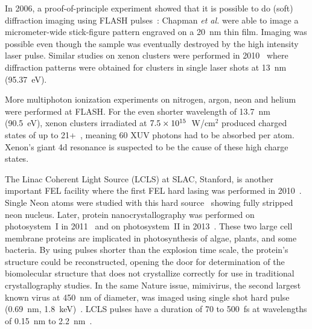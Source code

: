 In 2006, a proof-of-principle experiment showed that it is possible to
do (soft) \xray diffraction imaging using FLASH pulses~\cite{Chapman2006}:
Chapman \textit{et al.} were able to image a micrometer-wide stick-figure pattern
engraved on a 20~nm thin film. Imaging was possible even though the sample was
eventually destroyed by the high intensity \xray laser pulse.
Similar studies on xenon clusters were performed in 2010~\cite{Bostedt2010} where
diffraction patterns were obtained for clusters in single laser shots
at 13~nm (95.37~eV).

More multiphoton
ionization experiments on nitrogen, argon, neon and helium were performed at
FLASH.
For the even shorter wavelength of 13.7~nm (90.5~eV), xenon clusters irradiated at
$\ten{7.5}{15}$~W/cm$^2$ produced charged states of up to 21+~\cite{Sorokin2007,Richter2009},
meaning 60 XUV photons had to be absorbed per atom. Xenon's giant 4d
resonance is suspected to be the cause of these high charge states.

The Linac Coherent Light Source (LCLS) at SLAC, Stanford, is another important
FEL facility where the first FEL hard \xrays lasing was
performed in 2010~\cite{Emma2010,Schneider2010}. Single Neon atoms were studied with
this hard \xray source~\cite{Young2010} showing fully stripped neon nucleus.
Later, protein nanocrystallography was performed
on photosystem~I in 2011~\cite{Chapman2011} and on photosystem~II in
2013~\cite{Kern2013}. These two large cell membrane proteins are implicated in
photosynthesis of algae, plants, and some bacteria.
By using pulses shorter
than the explosion time scale, the protein's structure could be reconstructed,
opening the door for determination of the biomolecular structure that
does not crystallize correctly for use in traditional crystallography studies.
In the same Nature issue, mimivirus, the second largest known virus at 450~nm
of diameter, was imaged using single shot hard \xray pulse (0.69~nm,
1.8~keV)~\cite{Seibert2011}. LCLS pulses have a duration of 70 to 500~fs at
wavelengths of 0.15~nm to 2.2~nm~\cite{Pellegrini2011}.

